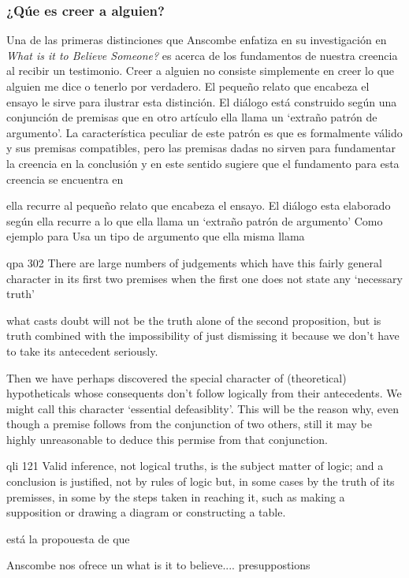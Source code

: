 \subsubsection{¿Qúe es creer a alguien?}

Una de las primeras distinciones que Anscombe enfatiza en su investigación en \emph{What is it to Believe Someone?} es acerca de los fundamentos de nuestra creencia al recibir un testimonio. Creer a alguien no consiste simplemente en creer lo que alguien me dice o tenerlo por verdadero. El pequeño relato que encabeza el ensayo le sirve para ilustrar esta distinción. El diálogo está construido según una conjunción de premisas que en otro artículo ella llama un `extraño patrón de argumento'. La característica peculiar de este patrón es que es formalmente válido y sus premisas compatibles, pero las premisas dadas no sirven para fundamentar la creencia en la conclusión y en este sentido sugiere que el fundamento para esta creencia se encuentra en

 ella recurre al pequeño relato que encabeza el ensayo. El diálogo esta elaborado según
ella recurre a lo que ella llama un `extraño patrón de argumento'
Como ejemplo para
Usa un tipo de argumento que ella misma llama


qpa 302
There are large numbers of judgements which have this fairly general character in its first two premises when the first one does not state any `necessary truth'

what casts doubt will not be the truth alone of the second proposition, but is truth combined with the impossibility of just dismissing it because we don't have to take its antecedent seriously.

Then we have perhaps discovered the special character of (theoretical) hypotheticals whose consequents don't follow logically from their antecedents. We might call this character `essential defeasiblity'. This will be the reason why, even though a premise follows from the conjunction of two others, still it may be highly unreasonable to deduce this permise from that conjunction.

qli 121 Valid inference, not logical truths, is the subject matter of logic; and a conclusion is justified, not by rules of logic but, in some cases by the truth of its premisses, in some by the steps taken in reaching it, such as making a supposition or drawing a diagram or constructing a table.

está la propouesta de que

Anscombe nos ofrece un
what is it to believe.... presuppostions


